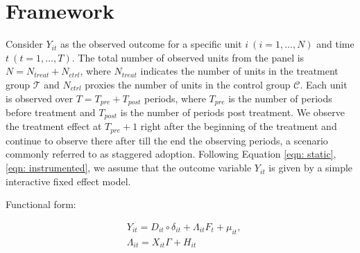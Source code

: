 \documentclass[12pt]{article}
\begin{document}
\section{Framework} 
\label{sec: framework}

Consider $Y_{it}$ as the observed outcome for a specific unit $i \ (i = 1, \dots, N)$ and time $t \ (t = 1, \dots, T)$. The total number of observed units from the panel is $N = N_{treat} + N_{ctrl}$, where $N_{treat}$ indicates the number of units in the treatment group $\mathcal{T}$ and $N_{ctrl}$ proxies the number of units in the control group $\mathcal{C}$. Each unit is observed over $T = T_{pre} + T_{post}$ periods, where $T_{pre}$ is the number of periods before treatment and $T_{post}$ is the number of periods post treatment. We observe the treatment effect at $T_{pre} + 1$ right after the beginning of the treatment and continue to observe there after till the end the observing periods, a scenario commonly referred to as staggered adoption. Following Equation \ref{eqn: static}, \ref{eqn: instrumented}, we assume that the outcome variable $Y_{it}$ is given by a simple interactive fixed effect model.

\begin{assumption}
Functional form:
\label{ass: function}
\end{assumption}

\begin{equation}
\begin{aligned}
& Y_{it} = D_{it} \circ \delta_{it} + \Lambda_{it}F_{t} + \mu_{it}, \\
& \Lambda_{it} = X_{it}\Gamma + H_{it}
\end{aligned}
\label{eqn: functional form}
\end{equation}
\end{document}
